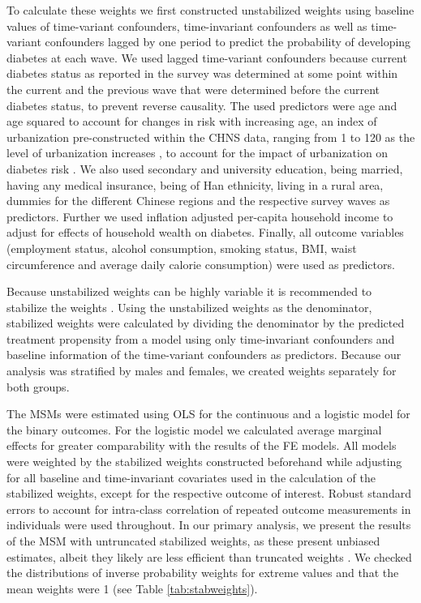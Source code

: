 To calculate these weights we first constructed unstabilized weights using baseline values of time-variant confounders, time-invariant confounders as well as time-variant confounders lagged by one period to predict the probability of developing diabetes at each wave. We used lagged time-variant confounders because current diabetes status as reported in the survey was determined at some point within the current and the previous wave that were determined before the current diabetes status, to prevent reverse causality. The used predictors were age and age squared to account for changes in risk with increasing age, an index of urbanization pre-constructed within the \ac{CHNS} data, ranging from 1 to 120 as the level of urbanization increases \parencite{Zhang2014d}, to account for the impact of urbanization on diabetes risk \parencite{Attard2012}. We also used secondary and university education, being married, having any medical insurance, being of Han ethnicity, living in a rural area, dummies for the different Chinese regions and the respective survey waves as predictors. Further we used inflation adjusted per-capita household income to adjust for effects of household wealth on diabetes. Finally, all outcome variables (employment status, alcohol consumption, smoking status, \ac{BMI}, waist circumference and average daily calorie consumption) were used as predictors. 

Because unstabilized weights can be highly variable it is recommended to stabilize the weights \parencite{Cole2008}. Using the unstabilized weights as the denominator, stabilized weights were calculated by dividing the denominator by the predicted treatment propensity from a model using only time-invariant confounders and baseline information of the time-variant confounders as predictors.  Because our analysis was stratified by males and females, we created weights separately for both groups.

The \acp{MSM} were estimated using \ac{OLS} for the continuous and a logistic model for the binary outcomes. For the logistic model we calculated average marginal effects for greater comparability with the results of the \ac{FE} models. All models were weighted by the stabilized weights constructed beforehand while adjusting for all baseline and time-invariant covariates used in the calculation of the stabilized weights, except for the respective outcome of interest. Robust standard errors to account for intra-class correlation of repeated outcome measurements in individuals were used throughout. In our primary analysis, we present the results of the \ac{MSM} with untruncated stabilized weights, as these present unbiased estimates, albeit they likely are less efficient than truncated weights \parencite{Cole2008}. We checked the distributions of inverse probability weights for extreme values and that the mean weights were 1 (see Table \ref{tab:stabweights}).

